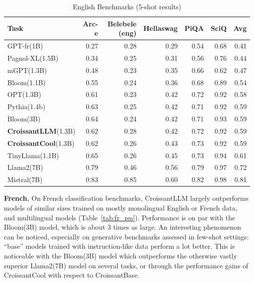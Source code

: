     \begin{table}
        \centering


            \begin{tabular}{lrrrrrr}
            \toprule
            Task & Arc-e & Belebele (eng) & Hellaswag & PiQA & SciQ & Avg \\
            \midrule
            GPT-fr(1B)& 0.27 & 0.28 & 0.29 & 0.54 & 0.68 & 0.41 \\
            Pagnol-XL(1.5B) & 0.34 & 0.25 & 0.31 & 0.56 & 0.76 & 0.44 \\
            mGPT(1.3B) & 0.48 & 0.23 & 0.35 & 0.66 & 0.62 & 0.47 \\
            
            Bloom(1.1B) & 0.55 & 0.24 & 0.36 & 0.68 & 0.89 & 0.54 \\
            OPT(1.3B) & 0.61 & 0.23 & 0.42 & 0.72 & 0.92 & 0.58 \\
            Pythia(1.4b)& 0.63 & 0.25 & 0.42 & 0.71 & 0.92 & 0.59 \\
            Bloom(3B)  & 0.64 & 0.24 & 0.42 & 0.71 & 0.93 & 0.59 \\
            \textbf{CroissantLLM}(1.3B) & 0.62 & 0.28 & 0.42 & 0.72 & 0.92 & 0.59 \\
            \textbf{CroissantCool}(1.3B) & 0.62 & 0.26 & 0.43 & 0.73 & 0.92 & 0.59 \\
            TinyLlama(1.1B) & 0.65 & 0.26 & 0.45 & 0.73 & 0.94 & 0.61 \\
            \midrule
            Llama2(7B) & 0.79 & 0.46 & 0.56 & 0.79 & 0.97 & 0.72 \\
            Mistral(7B) & 0.83 & 0.85 & 0.60 & 0.82 & 0.98 & 0.81 \\
            \bottomrule
            \end{tabular}
    

    \caption[English benchmarks results]{English Benchmarks (5-shot results)}
    \label{tab:eng_res}
\end{table}




\textbf{French.}
On French classification benchmarks, CroissantLLM largely outperforms models of similar sizes trained on mostly monolingual English or French data, and multilingual models (Table~\ref{tab:fr_res}). Performance is on par with the Bloom(3B) model, which is about 3 times as large. An interesting phenomenon can be noticed, especially on generative benchmarks assessed in few-shot settings: ``base'' models trained with instruction-like data perform a lot better. This is noticeable with the Bloom(3B) model which outperforms the otherwise vastly superior Llama2(7B) model on several tasks, or through the performance gains of CroissantCool with respect to CroissantBase.


